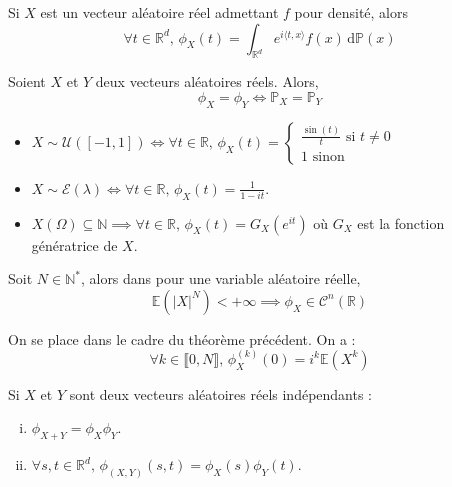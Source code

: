 	
	\begin{remark}
		Si $X$ est un vecteur aléatoire réel admettant $f$ pour densité, alors
		\[ \forall t \in \mathbb{R}^d, \, \phi_X(t) = \int_{\mathbb{R}^d} e^{i \langle t, x \rangle} f(x) \, \mathrm{d}\mathbb{P}(x) \]
	\end{remark}
	
	
	\begin{theorem}
		Soient $X$ et $Y$ deux vecteurs aléatoires réels. Alors,
		\[ \phi_X = \phi_Y \iff \mathbb{P}_X = \mathbb{P}_Y \]
	\end{theorem}
	
	\begin{example}
		\begin{itemize}
			\item $X \sim \mathcal{U}([-1, 1]) \iff \forall t \in \mathbb{R}, \, \phi_X(t) = \begin{cases}
				\frac{\sin(t)}{t} \text{ si } t \neq 0 \\
				1 \text{ sinon}
			\end{cases}$
			\item $X \sim \mathcal{E}(\lambda) \iff \forall t \in \mathbb{R}, \, \phi_X(t) = \frac{1}{1-it}$.
			\item $X(\Omega) \subseteq \mathbb{N} \implies \forall t \in \mathbb{R}, \, \phi_X(t) = G_X(e^{it})$ où $G_X$ est la fonction génératrice de $X$.
		\end{itemize}
	\end{example}
	
	\begin{theorem}
		Soit $N \in \mathbb{N}^*$, alors dans pour une variable aléatoire réelle,
		\[ \mathbb{E}(\vert X \vert^N) < +\infty \implies \phi_X \in \mathcal{C}^n(\mathbb{R}) \]
	\end{theorem}
	
	\begin{corollary}
		On se place dans le cadre du théorème précédent. On a :
		\[ \forall k \in \llbracket 0, N \rrbracket, \, \phi_X^{(k)} (0) = i^k \mathbb{E}(X^k) \]
	\end{corollary}
	
	\begin{theorem}
		Si $X$ et $Y$ sont deux vecteurs aléatoires réels indépendants :
		\begin{enumerate}[(i)]
			\item $\phi_{X+Y} = \phi_X \phi_Y$.
			\item $\forall s, t \in \mathbb{R}^d, \, \phi_{(X,Y)}(s,t) = \phi_X(s) \phi_Y(t)$.
		\end{enumerate}
	\end{theorem}

